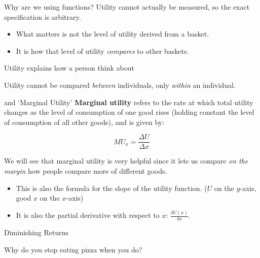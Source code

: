 \documentclass[12pt,t]{beamer}
\begin{document}
\begin{frame}{Why are we using functions?}
  Utility cannot actually be measured, so the exact specification is arbitrary.

  \begin{itemize}
    \item What matters is not the level of utility derived from a basket.
    
    \item It is how that level of utility \textit{compares} to other baskets. 
  \end{itemize}

  \pause\bigskip 
  Utility explains how a person think about 

  \pause\bigskip 
  Utility cannot be compared \textit{between} individuals, only \textit{within} an individual. 

\end{frame}

\begin{frame}{ and `Marginal Utility'}
  \textbf{Marginal utility} refers to the rate at which total utility changes as the level of consumption of one good rises (holding constant the level of consumption of all other goods), and is given by:

  $$ 
    MU_x = \frac{\Delta U}{\Delta	x}
  $$ 
  
  We will see that marginal utility is very helpful since it lets us compare \emph{on the margin} how people compare more of different goods.

  \pause 
  \begin{itemize}
    \item This is also the formula for the slope of the utility function. ($U$ on the $y$-axis, good $x$ on the $x$-axis)
    \item It is also the partial derivative with respect to $x$: $\frac{\delta U(x)}{\delta x}$.
  \end{itemize}
\end{frame}

\begin{frame}[c]{Diminishing Returns}
  \begin{center}
    Why do you stop eating pizza when you do?
  \end{center}
\end{frame}
\end{document}
